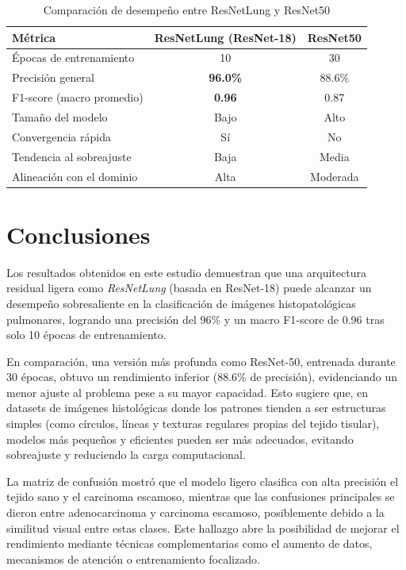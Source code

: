 \documentclass[conference]{IEEEtran}
\begin{document}
\begin{table}[H]
\centering
\caption{Comparación de desempeño entre ResNetLung y ResNet50}
\label{tab:comparison}
\begin{tabular}{|l|c|c|}
\hline
\textbf{Métrica} & \textbf{ResNetLung (ResNet-18)} & \textbf{ResNet50} \\
\hline
Épocas de entrenamiento & 10 & 30 \\
Precisión general & \textbf{96.0\%} & 88.6\% \\
F1-score (macro promedio) & \textbf{0.96} & 0.87 \\
Tamaño del modelo & Bajo & Alto \\
Convergencia rápida & Sí & No \\
Tendencia al sobreajuste & Baja & Media \\
Alineación con el dominio & Alta & Moderada \\
\hline
\end{tabular}
\end{table}
\section{Conclusiones}

Los resultados obtenidos en este estudio demuestran que una arquitectura residual ligera como \textit{ResNetLung} (basada en ResNet-18) puede alcanzar un desempeño sobresaliente en la clasificación de imágenes histopatológicas pulmonares, logrando una precisión del 96\% y un macro F1-score de 0.96 tras solo 10 épocas de entrenamiento.

En comparación, una versión más profunda como ResNet-50, entrenada durante 30 épocas, obtuvo un rendimiento inferior (88.6\% de precisión), evidenciando un menor ajuste al problema pese a su mayor capacidad. Esto sugiere que, en datasets de imágenes histológicas donde los patrones tienden a ser estructuras simples (como círculos, líneas y texturas regulares propias del tejido tisular), modelos más pequeños y eficientes pueden ser más adecuados, evitando sobreajuste y reduciendo la carga computacional.

La matriz de confusión mostró que el modelo ligero clasifica con alta precisión el tejido sano y el carcinoma escamoso, mientras que las confusiones principales se dieron entre adenocarcinoma y carcinoma escamoso, posiblemente debido a la similitud visual entre estas clases. Este hallazgo abre la posibilidad de mejorar el rendimiento mediante técnicas complementarias como el aumento de datos, mecanismos de atención o entrenamiento focalizado.
\end{document}
